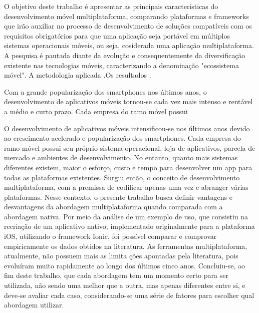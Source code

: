 O objetivo deste trabalho é apresentar as principais características do desenvolvimento móvel multiplataforma, comparando plataformas e
frameworks que irão auxiliar no processo de desenvolvimento de soluções compatíveis com os requisitos obrigatórios para que uma aplicação seja
portável em múltiplos sistemas operacionais móveis, ou seja, cosiderada uma aplicação multiplataforma. A pesquisa é pautada diante da evolução e consequentemente da diversificação existente nas tecnologias móveis, caracterizando a denominação "ecossistema móvel". A metodologia aplicada .Os resultados .


Com a grande popularização dos smartphones nos últimos anos, o desenvolvimento de aplicativos móveis tornou-se cada vez mais intenso e rentável a médio e curto prazo. Cada empresa do ramo móvel possui

O desenvolvimento de aplicativos móveis intensificou-se nos últimos anos devido ao crescimento acelerado e popularização dos smartphones. Cada empresa do ramo móvel possui seu próprio sistema operacional, loja de aplicativos, parcela de mercado e ambientes de desenvolvimento. No entanto, quanto mais sistemas diferentes existem, maior o esforço, custo e tempo para desenvolver um app para todas as plataformas existentes. Surgiu então, o conceito de desenvolvimento multiplataforma, com a premissa de codificar apenas uma vez e abranger várias plataformas. Nesse contexto, o presente trabalho busca definir vantagens e desvantagens da abordagem multiplataforma quando comparada com a abordagem nativa. Por meio da análise de um exemplo de uso, que consistiu na recriação de um aplicativo nativo, implementado originalmente para a plataforma iOS, utilizando o framework Ionic, foi possível comparar e comprovar empiricamente os dados obtidos na literatura. As ferramentas multiplataforma, atualmente, não possuem mais as limita ções apontadas pela literatura, pois evoluíram muito rapidamente ao longo dos últimos cinco anos. Concluiu-se, ao fim deste trabalho, que cada abordagem tem um momento certo para ser utilizada, não sendo uma melhor que a outra, mas apenas diferentes entre si, e deve-se avaliar cada caso, considerando-se uma série de fatores para escolher qual abordagem utilizar.

